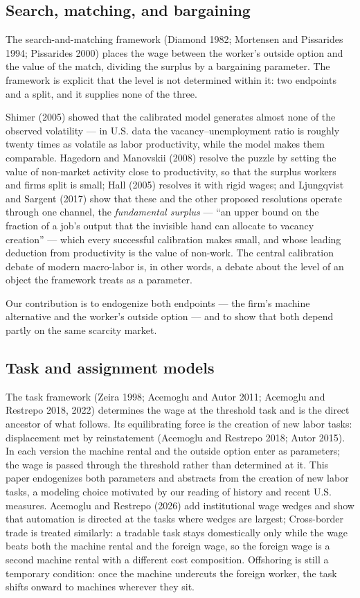 \documentclass[12pt]{article}
\theoremstyle{plain}
\begin{document}
\subsection{Search, matching, and bargaining}\label{sec:search}

The search-and-matching framework (Diamond 1982; Mortensen and Pissarides 1994; Pissarides 2000) places the wage between the worker's outside option and the value of the match, dividing the surplus by a bargaining parameter. The framework is explicit that the level is not determined within it: two endpoints and a split, and it supplies none of the three.

Shimer (2005) showed that the calibrated model generates almost none of the observed volatility --- in U.S. data the vacancy--unemployment ratio is roughly twenty times as volatile as labor productivity, while the model makes them comparable. Hagedorn and Manovskii (2008) resolve the puzzle by setting the value of non-market activity close to productivity, so that the surplus workers and firms split is small; Hall (2005) resolves it with rigid wages; and Ljungqvist and Sargent (2017) show that these and the other proposed resolutions operate through one channel, the \emph{fundamental surplus} --- ``an upper bound on the fraction of a job's output that the invisible hand can allocate to vacancy creation'' --- which every successful calibration makes small, and whose leading deduction from productivity is the value of non-work. The central calibration debate of modern macro-labor is, in other words, a debate about the level of an object the framework treats as a parameter.

Our contribution is to endogenize both endpoints --- the firm's machine alternative and the worker's outside option --- and to show that both depend partly on the same scarcity market.

\subsection{Task and assignment models}\label{sec:tasks}

The task framework (Zeira 1998; Acemoglu and Autor 2011; Acemoglu and Restrepo 2018, 2022) determines the wage at the threshold task and is the direct ancestor of what follows. Its equilibrating force is the creation of new labor tasks: displacement met by reinstatement (Acemoglu and Restrepo 2018; Autor 2015). In each version the machine rental and the outside option enter as parameters; the wage is passed through the threshold rather than determined at it. This paper endogenizes both parameters and abstracts from the creation of new labor tasks, a modeling choice motivated by our reading of history and recent U.S. measures. Acemoglu and Restrepo (2026) add institutional wage wedges and show that automation is directed at the tasks where wedges are largest;  Cross-border trade is treated similarly: a tradable task stays domestically only while the wage beats both the machine rental and the foreign wage, so the foreign wage is a second machine rental with a different cost composition. Offshoring is still a temporary condition: once the machine undercuts the foreign worker, the task shifts onward to machines wherever they sit.
\end{document}
